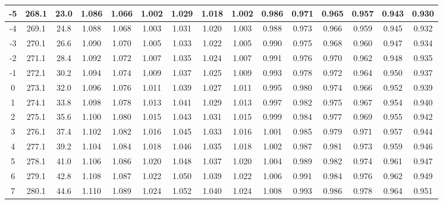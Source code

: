 \documentclass[12pt,a4paper,twoside]{article}
\begin{document}
\begin{center}
\begin{longtable}{ c c c | c c c c c c c c c c c c}
 -5 & 268.1 & 23.0 & 1.086 & 1.066 & 1.002 & 1.029 & 1.018 & 1.002 & 0.986 & 0.971 & 0.965 & 0.957 & 0.943 & 0.930 \\ \hline   
 
 -4 & 269.1 & 24.8 & 1.088 & 1.068 & 1.003 & 1.031 & 1.020 & 1.003 & 0.988 & 0.973 & 0.966 & 0.959 & 0.945 & 0.932 \\ \hline   
 
 -3 & 270.1 & 26.6 & 1.090 & 1.070 & 1.005 & 1.033 & 1.022 & 1.005 & 0.990 & 0.975 & 0.968 & 0.960 & 0.947 & 0.934 \\ \hline   
 
 -2 & 271.1 & 28.4 & 1.092 & 1.072 & 1.007 & 1.035 & 1.024 & 1.007 & 0.991 & 0.976 & 0.970 & 0.962 & 0.948 & 0.935 \\ \hline   
 
 -1 & 272.1 & 30.2 & 1.094 & 1.074 & 1.009 & 1.037 & 1.025 & 1.009 & 0.993 & 0.978 & 0.972 & 0.964 & 0.950 & 0.937 \\ \hline   
 
 0 & 273.1 & 32.0 & 1.096 & 1.076 & 1.011 & 1.039 & 1.027 & 1.011 & 0.995 & 0.980 & 0.974 & 0.966 & 0.952 & 0.939 \\ \hline   
 
 1 & 274.1 & 33.8 & 1.098 & 1.078 & 1.013 & 1.041 & 1.029 & 1.013 & 0.997 & 0.982 & 0.975 & 0.967 & 0.954 & 0.940 \\ \hline   
 
 2 & 275.1 & 35.6 & 1.100 & 1.080 & 1.015 & 1.043 & 1.031 & 1.015 & 0.999 & 0.984 & 0.977 & 0.969 & 0.955 & 0.942 \\ \hline   
 
 3 & 276.1 & 37.4 & 1.102 & 1.082 & 1.016 & 1.045 & 1.033 & 1.016 & 1.001 & 0.985 & 0.979 & 0.971 & 0.957 & 0.944 \\ \hline   
 
 4 & 277.1 & 39.2 & 1.104 & 1.084 & 1.018 & 1.046 & 1.035 & 1.018 & 1.002 & 0.987 & 0.981 & 0.973 & 0.959 & 0.946 \\ \hline   
 
 5 & 278.1 & 41.0 & 1.106 & 1.086 & 1.020 & 1.048 & 1.037 & 1.020 & 1.004 & 0.989 & 0.982 & 0.974 & 0.961 & 0.947 \\ \hline   
 
 6 & 279.1 & 42.8 & 1.108 & 1.087 & 1.022 & 1.050 & 1.039 & 1.022 & 1.006 & 0.991 & 0.984 & 0.976 & 0.962 & 0.949 \\ \hline   
 
 7 & 280.1 & 44.6 & 1.110 & 1.089 & 1.024 & 1.052 & 1.040 & 1.024 & 1.008 & 0.993 & 0.986 & 0.978 & 0.964 & 0.951 \\ \hline   
 

\end{longtable}
\end{center}
\end{document}
